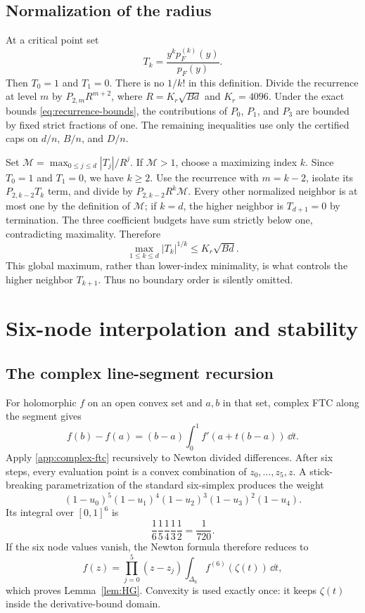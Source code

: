 \subsection{Normalization of the radius}

At a critical point set
\[
 T_k=\frac{y^kp_F^{(k)}(y)}{p_F(y)}.
\]
Then $T_0=1$ and $T_1=0$.  There is no $1/k!$ in this definition.  Divide
the recurrence at level $m$ by $P_{2,m}R^{m+2}$, where
$R=K_r\sqrt{Bd}$ and $K_r=4096$.  Under the exact bounds
\eqref{eq:recurrence-bounds}, the contributions of $P_0$, $P_1$, and $P_3$
are bounded by fixed strict fractions of one.  The remaining inequalities
use only the certified caps on $d/n$, $B/n$, and $D/n$.

Set $\mathcal M=\max_{0\le j\le d}|T_j|/R^j$.  If $\mathcal M>1$, choose a
maximizing index $k$.  Since $T_0=1$ and $T_1=0$, we have $k\ge2$.  Use the
recurrence with $m=k-2$, isolate its $P_{2,k-2}T_k$ term, and divide by
$P_{2,k-2}R^k\mathcal M$.  Every other normalized neighbor is at most one by
the definition of $\mathcal M$; if $k=d$, the higher neighbor is
$T_{d+1}=0$ by termination.  The three coefficient budgets have sum strictly
below one, contradicting maximality.  Therefore
\[
 \max_{1\le k\le d}|T_k|^{1/k}\le K_r\sqrt{Bd}.
\]
This global maximum, rather than lower-index minimality, is what controls the
higher neighbor $T_{k+1}$.  Thus no boundary order is silently omitted.

\section{Six-node interpolation and stability}\label{app:HG-details}

\subsection{The complex line-segment recursion}

For holomorphic $f$ on an open convex set and $a,b$ in that set, complex FTC
along the segment gives
\begin{equation}\label{app:complex-ftc}
 f(b)-f(a)=(b-a)\int_0^1f'(a+t(b-a))\,\dd t.
\end{equation}
Apply \eqref{app:complex-ftc} recursively to Newton divided differences.
After six steps, every evaluation point is a convex combination of
$z_0,\ldots,z_5,z$.  A stick-breaking parametrization of the standard
six-simplex produces the weight
\[
 (1-u_0)^5(1-u_1)^4(1-u_2)^3(1-u_3)^2(1-u_4).
\]
Its integral over $[0,1]^6$ is
\[
 \frac16\frac15\frac14\frac13\frac12=\frac1{720}.
\]
If the six node values vanish, the Newton formula therefore reduces to
\[
 f(z)=\prod_{j=0}^5(z-z_j)
 \int_{\Delta_6}f^{(6)}(\zeta(t))\,\dd t,
\]
which proves Lemma~\ref{lem:HG}.  Convexity is used exactly once: it keeps
$\zeta(t)$ inside the derivative-bound domain.


